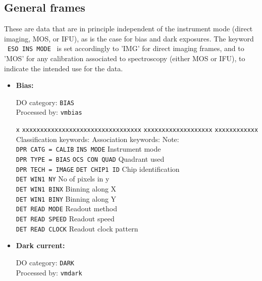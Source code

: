 \subsection{General frames}
\label{DATA:GEN}

These are data that are in principle independent of the instrument mode 
(direct imaging, MOS, or IFU), as is the case for bias and dark exposures. 
The keyword \ {\tt ESO INS MODE} \ is set accordingly to 'IMG' for direct 
imaging frames, and to 'MOS' for any calibration associated to spectroscopy 
(either MOS or IFU), to indicate the intended use for the data.


{\small \begin{itemize}

\item {\bf Bias:}

DO category: {\tt BIAS} \\
Processed by: {\tt vmbias}

\begin{tabbing}
{\tt x} \= {\tt xxxxxxxxxxxxxxxxxxxxxxxxxxxxxxxxx} \= {\tt xxxxxxxxxxxxxxxxxxx} \= {\tt xxxxxxxxxxxx} \kill
\> Classification keywords: \> Association keywords: \> Note: \\
\> {\tt DPR CATG = CALIB} \> {\tt INS MODE} \> Instrument mode \\
\> {\tt DPR TYPE = BIAS} \> {\tt OCS CON QUAD} \> Quadrant used \\
\> {\tt DPR TECH = IMAGE} \> {\tt DET CHIP1 ID} \> Chip identification \\
\> \> {\tt DET WIN1 NY} \> No of pixels in y \\
\> \> {\tt DET WIN1 BINX} \> Binning along X \\
\> \> {\tt DET WIN1 BINY} \> Binning along Y \\
\> \> {\tt DET READ MODE} \> Readout method \\
\> \> {\tt DET READ SPEED} \> Readout speed \\
\> \> {\tt DET READ CLOCK} \> Readout clock pattern \\
\end{tabbing}

\item {\bf Dark current:}

DO category: {\tt DARK} \\
Processed by: {\tt vmdark}


\end{itemize}}
